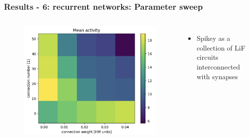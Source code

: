 \documentclass{beamer}
\begin{document}
\begin{frame}
    \frametitle{Results - 6: recurrent networks: Parameter sweep}
    \begin{columns}
          	\begin{figure}
    				\centering
    				\includegraphics[width=\linewidth]{figures/activity_sweep.png}
 		   \end{figure}
 		   \begin{itemize}
          		\item Spikey as a collection of LiF circuits interconnected with synapses
          	\end{itemize}


\end{columns}
\end{frame}
\end{document}
